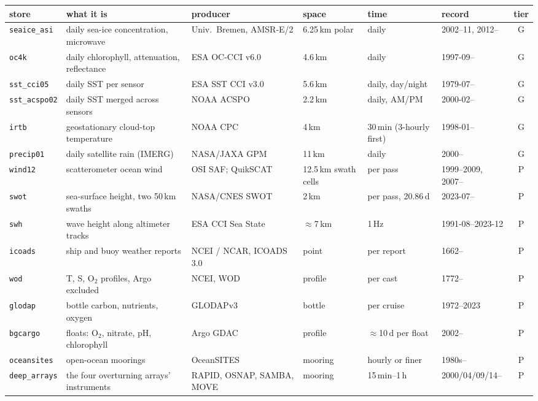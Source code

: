 \documentclass[10pt]{article}
\newcommand{\code}[1]{\texttt{#1}}
\begin{document}
\begin{table}[t]
\centering\scriptsize\setlength{\tabcolsep}{3pt}
\begin{tabular}{@{}L{1.6cm}L{4.1cm}L{2.2cm}L{1.9cm}L{1.9cm}L{2.0cm}c@{}}
\toprule
store & what it is & producer & space & time & record & tier \\
\midrule
\code{seaice\_asi} & daily sea-ice concentration, microwave & Univ.\ Bremen, AMSR-E/2 & 6.25\,km polar & daily & 2002--11, 2012-- & G \\
\code{oc4k} & daily chlorophyll, attenuation, reflectance & ESA OC-CCI v6.0 & 4.6\,km & daily & 1997-09-- & G \\
\code{sst\_cci05} & daily SST per sensor & ESA SST CCI v3.0 & 5.6\,km & daily, day/night & 1979-07-- & G \\
\code{sst\_acspo02} & daily SST merged across sensors & NOAA ACSPO & 2.2\,km & daily, AM/PM & 2000-02-- & G \\
\code{irtb} & geostationary cloud-top temperature & NOAA CPC & 4\,km & 30\,min (3-hourly first) & 1998-01-- & G \\
\code{precip01} & daily satellite rain (IMERG) & NASA/JAXA GPM & 11\,km & daily & 2000-- & G \\
\code{wind12} & scatterometer ocean wind & OSI SAF; QuikSCAT & 12.5\,km swath cells & per pass & 1999--2009, 2007-- & P \\
\code{swot} & sea-surface height, two 50\,km swaths & NASA/CNES SWOT & 2\,km & per pass, 20.86\,d & 2023-07-- & P \\
\code{swh} & wave height along altimeter tracks & ESA CCI Sea State & ${\approx}$7\,km & 1\,Hz & 1991-08--2023-12 & P \\
\code{icoads} & ship and buoy weather reports & NCEI / NCAR, ICOADS 3.0 & point & per report & 1662-- & P \\
\code{wod} & T, S, O$_2$ profiles, Argo excluded & NCEI, WOD & profile & per cast & 1772-- & P \\
\code{glodap} & bottle carbon, nutrients, oxygen & GLODAPv3 & bottle & per cruise & 1972--2023 & P \\
\code{bgcargo} & floats: O$_2$, nitrate, pH, chlorophyll & Argo GDAC & profile & ${\approx}$10\,d per float & 2002-- & P \\
\code{oceansites} & open-ocean moorings & OceanSITES & mooring & hourly or finer & 1980s-- & P \\
\code{deep\_arrays} & the four overturning arrays' instruments & RAPID, OSNAP, SAMBA, MOVE & mooring & 15\,min--1\,h & 2000/04/09/14-- & P \\

\end{tabular}
\end{table}
\end{document}
